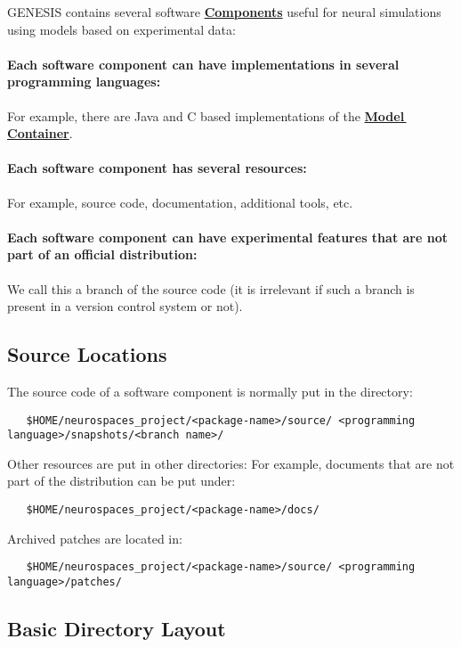 \documentclass[12pt]{article}
\begin{document}
GENESIS contains several software \href{../reserved-words/reserved-words.tex}{\bf Components} useful for neural simulations using models based on experimental data:
\paragraph{\bf Each software component can have implementations in several programming languages:} For example, there are Java and C based implementations of the \href{../model-container/model-container.tex}{\bf Model\,Container}.
\paragraph{\bf Each software component has several resources:} For example, source code, documentation, additional tools, etc.
\paragraph{\bf Each software component can have experimental features that are not part of an official distribution:} We call this a branch of the source code (it is irrelevant if such a branch is present in a version control system or not). 

\subsection*{Source Locations}

The source code of a software component is normally put in the directory:
\begin{verbatim}
   $HOME/neurospaces_project/<package-name>/source/ <programming language>/snapshots/<branch name>/
\end{verbatim}
Other resources are put in other directories: For example, documents that are not part of the distribution can be put under:
\begin{verbatim}
   $HOME/neurospaces_project/<package-name>/docs/
\end{verbatim}
Archived patches are located in:
\begin{verbatim}
   $HOME/neurospaces_project/<package-name>/source/ <programming language>/patches/ 
\end{verbatim}

\subsection*{Basic Directory Layout}
\end{document}
